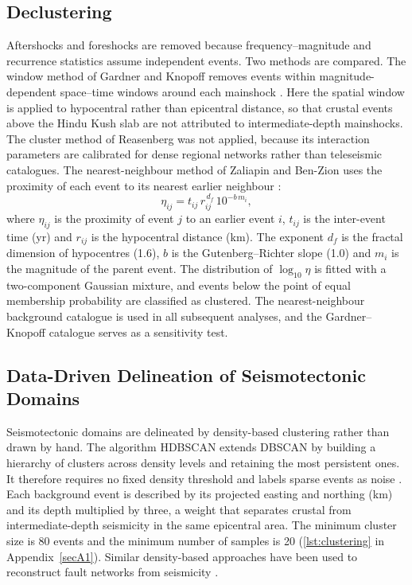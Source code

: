 \documentclass[11pt]{article}
\begin{document}
\subsection{Declustering}
Aftershocks and foreshocks are removed because frequency--magnitude and recurrence
statistics assume independent events. Two methods are compared. The window method
of Gardner and Knopoff removes events within magnitude-dependent space--time windows
around each mainshock \cite{Gardner1974}. Here the spatial window is applied to
hypocentral rather than epicentral distance, so that crustal events above the Hindu
Kush slab are not attributed to intermediate-depth mainshocks. The cluster method of
Reasenberg \cite{Reasenberg1985} was not applied, because its interaction parameters
are calibrated for dense regional networks rather than teleseismic catalogues. The
nearest-neighbour method of Zaliapin and Ben-Zion uses the proximity of each event to
its nearest earlier neighbour \cite{Zaliapin2008, Zaliapin2013, Zaliapin2016}:
\begin{equation}
  \eta_{ij} = t_{ij}\, r_{ij}^{\,d_f}\, 10^{-b\, m_i}, \label{eq:nnd}
\end{equation}
where $\eta_{ij}$ is the proximity of event $j$ to an earlier event $i$, $t_{ij}$ is
the inter-event time (yr) and $r_{ij}$ is the hypocentral distance (km). The
exponent $d_f$ is the fractal dimension of hypocentres (1.6), $b$ is the
Gutenberg--Richter slope (1.0) and $m_i$ is the magnitude of the parent event. The
distribution of $\log_{10}\eta$ is fitted with a two-component Gaussian mixture, and
events below the point of equal membership probability are classified as clustered.
The nearest-neighbour background catalogue is used in all subsequent analyses, and
the Gardner--Knopoff catalogue serves as a sensitivity test.

\subsection{Data-Driven Delineation of Seismotectonic Domains}
Seismotectonic domains are delineated by density-based clustering rather than drawn
by hand. The algorithm HDBSCAN extends DBSCAN by building a hierarchy of clusters
across density levels and retaining the most persistent ones. It therefore requires
no fixed density threshold and labels sparse events as noise
\cite{Ester1996, Campello2013, McInnes2017}. Each background event is described by
its projected easting and northing (km) and its depth multiplied by three, a weight
that separates crustal from intermediate-depth seismicity in the same epicentral
area. The minimum cluster size is 80 events and the minimum number of samples is 20
(\cref{lst:clustering} in Appendix~\ref{secA1}).
Similar density-based approaches have been used to reconstruct fault networks from
seismicity \cite{Ouillon2008}.
\end{document}
